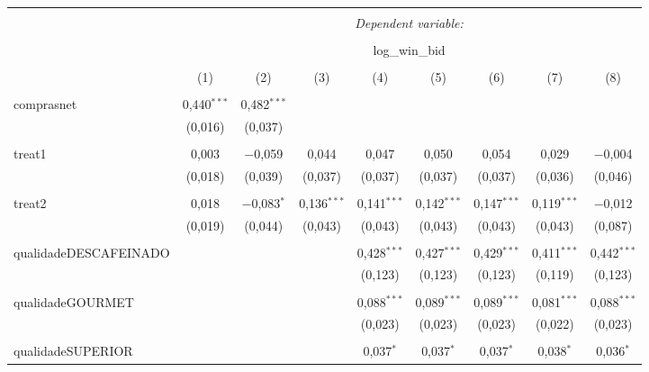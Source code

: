 
\begin{table}[!htbp] \centering 
  \caption{} 
  \label{} 
\begin{tabular}{@{\extracolsep{5pt}}lcccccccc} 
\\[-1.8ex]\hline 
\hline \\[-1.8ex] 
 & \multicolumn{8}{c}{\textit{Dependent variable:}} \\ 
\cline{2-9} 
\\[-1.8ex] & \multicolumn{8}{c}{log\_win\_bid} \\ 
\\[-1.8ex] & (1) & (2) & (3) & (4) & (5) & (6) & (7) & (8)\\ 
\hline \\[-1.8ex] 
 comprasnet & 0,440$^{***}$ & 0,482$^{***}$ &  &  &  &  &  &  \\ 
  & (0,016) & (0,037) &  &  &  &  &  &  \\ 
  & & & & & & & & \\ 
 treat1 & 0,003 & $-$0,059 & 0,044 & 0,047 & 0,050 & 0,054 & 0,029 & $-$0,004 \\ 
  & (0,018) & (0,039) & (0,037) & (0,037) & (0,037) & (0,037) & (0,036) & (0,046) \\ 
  & & & & & & & & \\ 
 treat2 & 0,018 & $-$0,083$^{*}$ & 0,136$^{***}$ & 0,141$^{***}$ & 0,142$^{***}$ & 0,147$^{***}$ & 0,119$^{***}$ & $-$0,012 \\ 
  & (0,019) & (0,044) & (0,043) & (0,043) & (0,043) & (0,043) & (0,043) & (0,087) \\ 
  & & & & & & & & \\ 
 qualidadeDESCAFEINADO &  &  &  & 0,428$^{***}$ & 0,427$^{***}$ & 0,429$^{***}$ & 0,411$^{***}$ & 0,442$^{***}$ \\ 
  &  &  &  & (0,123) & (0,123) & (0,123) & (0,119) & (0,123) \\ 
  & & & & & & & & \\ 
 qualidadeGOURMET &  &  &  & 0,088$^{***}$ & 0,089$^{***}$ & 0,089$^{***}$ & 0,081$^{***}$ & 0,088$^{***}$ \\ 
  &  &  &  & (0,023) & (0,023) & (0,023) & (0,022) & (0,023) \\ 
  & & & & & & & & \\ 
 qualidadeSUPERIOR &  &  &  & 0,037$^{*}$ & 0,037$^{*}$ & 0,037$^{*}$ & 0,038$^{*}$ & 0,036$^{*}$ \\ 

\end{tabular}
\end{table}
